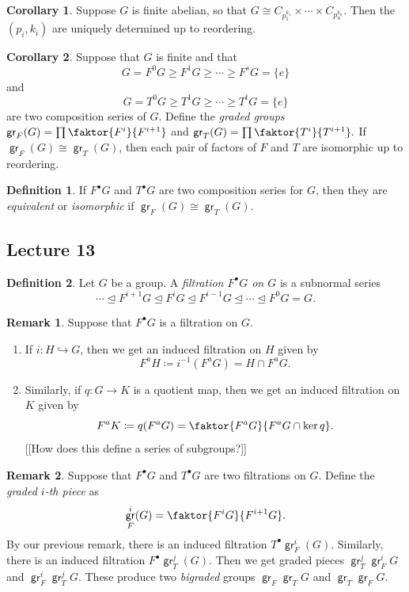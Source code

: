 \documentclass[10pt,letterpaper,cm]{nupset}
\theoremstyle{definition}
\newtheorem*{definition}{Definition}
\newtheorem{remark}{Remark}
\newtheorem{corollary}{Corollary}
\newcommand{\1}{\mathbf{1}}
\newcommand{\0}{\vec 0}
\DeclareMathOperator{\gr}{\mathsf{gr}}
\begin{document}
\begin{corollary}
Suppose $G$ is finite abelian, so that $G \cong C_{p_1^{k_1}} \times \cdots \times C_{p_n^{k_n}}$. Then the $(p_i, k_i)$ are uniquely determined up to reordering.
\end{corollary}

\begin{corollary}
Suppose that $G$ is finite and that $$ G = F^0G \geq F^1G \geq \cdots \geq F^sG = \{e\}  $$ and $$G = T^0G \geq T^1G \geq \cdots \geq T^tG = \{e\}$$ are two composition series of $G$. Define the \textit{graded groups} $\gr_F(G) = \prod \faktor{F^i}{F^{i+1}}$ and $\gr_T(G) = \prod \faktor{T^i}{T^{i+1}}.$ If $\gr_F(G) \cong \gr_T(G)$, then each pair of factors of $F$ and $T$ are isomorphic up to reordering. 
\end{corollary}

\begin{definition}
If $F^{\bullet}G$ and $T^{\bullet}G$ are two composition series for $G$, then they are \textit{equivalent} or \textit{isomorphic} if $\gr_F(G) \cong \gr_T(G)$.
\end{definition}

\subsection{Lecture 13}

\begin{definition}
Let $G$ be a group. A \textit{filtration $F^{\bullet}{G}$ on $G$} is a subnormal series
\[
\cdots \unlhd F^{i+1}{G} \unlhd F^i{G} \unlhd F^{i-1}{G} \unlhd \cdots \unlhd F^0{G} = G
.\]
\end{definition}

\begin{remark} Suppose that $F^{\bullet}G$ is a filtration on $G$.
\begin{enumerate}
\item If $i : H \hookrightarrow G$, then we get an induced filtration on $H$ given by $$F^a{H}\coloneqq  i^{-1}(F^aG) = H \cap F^a{G}.$$
\item Similarly, if $q: G \to K$ is a quotient map, then we get an induced filtration on $K$ given by $$F^aK\coloneqq  q(F^aG) = \faktor{F^aG}{F^aG \cap \ker q}.$$ {[[How does this define a series of subgroups?]]}
\end{enumerate}
\end{remark}

\begin{remark}
Suppose that $F^{\bullet}G$ and $T^{\bullet}G$ are two filtrations on $G$. Define the \textit{graded $i$-th piece} as $$\gr_F^i(G) = \faktor{F^iG}{F^{i+1}G}.$$ By our previous remark, there is an induced filtration $T^{\bullet}\gr_F^i(G)$. Similarly, there is an induced filtration $F^{\bullet}\gr_T^j(G)$. Then we get graded pieces $\gr_T^j\gr_F^iG$ and $\gr_F^i \gr_T^j G$. These produce two \textit{bigraded} groups $\gr_F\gr_TG$ and $\gr_T\gr_FG$.
\end{remark}
\end{document}
